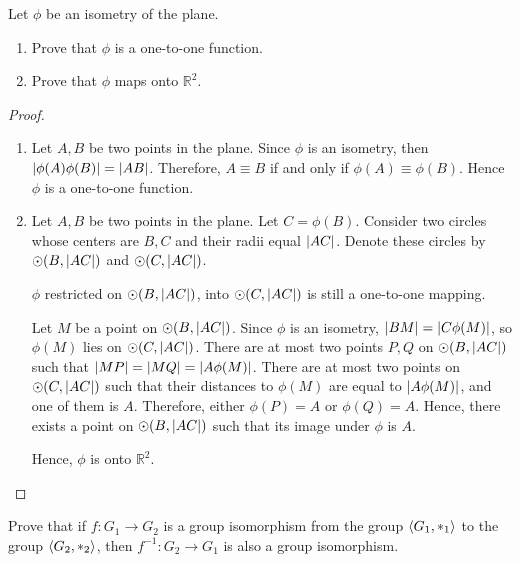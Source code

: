 \newpage
\begin{exercise}
    Let $\phi$ be an isometry of the plane.
    \begin{enumerate}[label={\textbf{\alph*.}}]
        \item Prove that $\phi$ is a one-to-one function.
        \item Prove that $\phi$ maps onto $\mathbb{R}^{2}$.
    \end{enumerate}
\end{exercise}

\begin{proof}
    \begin{enumerate}[label={\textbf{\alph*.}}]
        \item Let $A, B$ be two points in the plane. Since $\phi$ is an isometry, then $\left\vert{\phi(A)\phi(B)}\right\vert = \left\vert{AB}\right\vert$. Therefore, $A\equiv B$ if and only if $\phi(A)\equiv\phi(B)$. Hence $\phi$ is a one-to-one function.
        \item Let $A, B$ be two points in the plane. Let $C = \phi(B)$. Consider two circles whose centers are $B, C$ and their radii equal $\left\vert{AC}\right\vert$. Denote these circles by $\odot(B, \left\vert{AC}\right\vert)$ and $\odot(C, \left\vert{AC}\right\vert)$.

              $\phi$ restricted on $\odot(B, \left\vert{AC}\right\vert)$, into $\odot(C, \left\vert{AC}\right\vert)$ is still a one-to-one mapping.

              Let $M$ be a point on $\odot(B, \left\vert{AC}\right\vert)$. Since $\phi$ is an isometry, $\left\vert{BM}\right\vert = \left\vert{C\phi(M)}\right\vert$, so $\phi(M)$ lies on $\odot(C, \left\vert{AC}\right\vert)$. There are at most two points $P, Q$ on $\odot(B, \left\vert{AC}\right\vert)$ such that $\left\vert{MP}\right\vert = \left\vert{MQ}\right\vert = \left\vert{A\phi(M)}\right\vert$. There are at most two points on $\odot(C, \left\vert{AC}\right\vert)$ such that their distances to $\phi(M)$ are equal to $\left\vert{A\phi(M)}\right\vert$, and one of them is $A$. Therefore, either $\phi(P) = A$ or $\phi(Q) = A$. Hence, there exists a point on $\odot(B, \left\vert{AC}\right\vert)$ such that its image under $\phi$ is $A$.

              Hence, $\phi$ is onto $\mathbb{R}^{2}$.
    \end{enumerate}
\end{proof}

\newpage
\begin{exercise}
    Prove that if $f: G_{1} \to G_{2}$ is a group isomorphism from the group $\left\langle{G_{1}, {*}_{1}}\right\rangle$ to the group $\left\langle{G_{2}, {*}_{2}}\right\rangle$, then $f^{-1}: G_{2} \to G_{1}$ is also a group isomorphism.
\end{exercise}

